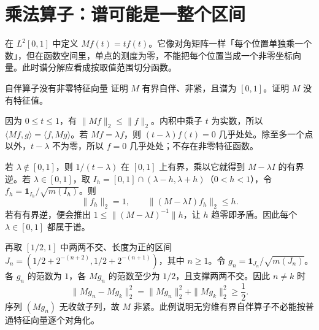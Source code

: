 \section{乘法算子：谱可能是一整个区间}

在 \(L^2[0,1]\) 中定义 \(Mf(t)=tf(t)\)。它像对角矩阵一样「每个位置单独乘一个数」，但在函数空间里，单点的测度为零，不能把每个位置当成一个非零坐标向量。此时谱分解应看成按取值范围切分函数。

\begin{example}{自伴算子没有非零特征向量}
证明 \(M\) 有界自伴、非紧，且谱为 \([0,1]\)。证明 \(M\) 没有特征值。
\end{example}
\begin{solution}
因为 \(0\leq t\leq1\)，有 \(\|Mf\|_2\leq\|f\|_2\)。内积中乘子 \(t\) 为实数，所以 \(\langle Mf,g\rangle=\langle f,Mg\rangle\)。若 \(Mf=\lambda f\)，则 \((t-\lambda)f(t)=0\) 几乎处处。除至多一个点以外，\(t-\lambda\) 不为零，所以 \(f=0\) 几乎处处；不存在非零特征函数。

若 \(\lambda\notin[0,1]\)，则 \(1/(t-\lambda)\) 在 \([0,1]\) 上有界，乘以它就得到 \(M-\lambda I\) 的有界逆。若 \(\lambda\in[0,1]\)，取 \(I_h=[0,1]\cap(\lambda-h,\lambda+h)\)（\(0<h<1\)），令 \(f_h=\mathbf1_{I_h}/\sqrt{m(I_h)}\)。则
\[
 \|f_h\|_2=1,\qquad \|(M-\lambda I)f_h\|_2\leq h.
\]
若有有界逆，便会推出 \(1\leq\|(M-\lambda I)^{-1}\|h\)，让 \(h\) 趋零即矛盾。因此每个 \(\lambda\in[0,1]\) 都属于谱。

再取 \([1/2,1]\) 中两两不交、长度为正的区间 \(J_n=(1/2+2^{-(n+2)},1/2+2^{-(n+1)})\)，其中 \(n\geq1\)。令 \(g_n=\mathbf1_{J_n}/\sqrt{m(J_n)}\)。各 \(g_n\) 的范数为 \(1\)，各 \(Mg_n\) 的范数至少为 \(1/2\)，且支撑两两不交。因此 \(n\ne k\) 时
\[
 \|Mg_n-Mg_k\|_2^2=\|Mg_n\|_2^2+\|Mg_k\|_2^2\geq\frac12.
\]
序列 \((Mg_n)\) 无收敛子列，故 \(M\) 非紧。此例说明无穷维有界自伴算子不必能按普通特征向量逐个对角化。
\end{solution}

